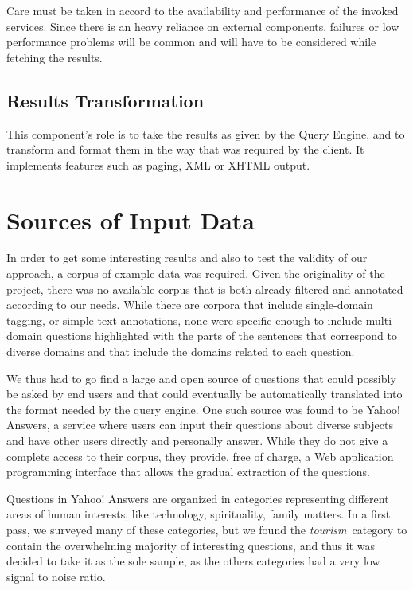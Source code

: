 Care must be taken in accord to the availability and performance of the invoked services. Since there is an heavy reliance on external components, failures or low performance problems will be common and will have to be considered while fetching the results.

\subsection{Results Transformation} %
\label{sub:results_transformation}
This component's role is to take the results as given by the Query Engine, and to transform and format them in the way that was required by the client. It implements features such as paging, XML or XHTML output.


\section{Sources of Input Data} %
\label{sec:sources_of_input_data}

In order to get some interesting results and also to test the validity of our approach, a corpus of example data was required. Given the originality of the project, there was no available corpus that is both already filtered and annotated according to our needs. While there are corpora that include single-domain tagging, or simple text annotations, none were specific enough to include multi-domain questions highlighted with the parts of the sentences that correspond to diverse domains and that include the domains related to each question.

We thus had to go find a large and open source of questions that could possibly be asked by end users and that could eventually be automatically translated into the format needed by the query engine. One such source was found to be Yahoo! Answers, a service where users can input their questions about diverse subjects and have other users directly and personally answer. While they do not give a complete access to their corpus, they provide, free of charge, a Web application programming interface that allows the gradual extraction of the questions.

Questions in Yahoo! Answers are organized in categories representing different areas of human interests, like technology, spirituality, family matters. In a first pass, we surveyed many of these categories, but we found the \emph{tourism}\ category to contain the overwhelming majority of interesting questions, and thus it was decided to take it as the sole sample, as the others categories had a very low signal to noise ratio.

